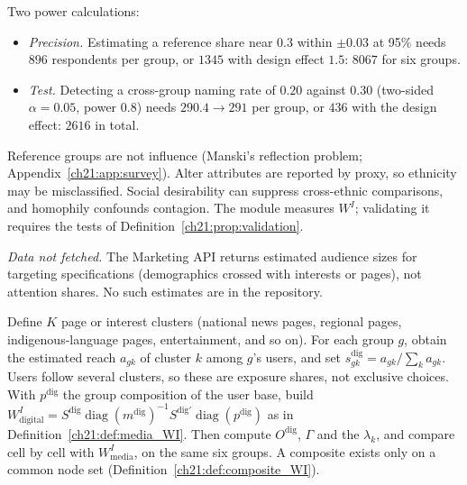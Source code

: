 \documentclass[../solutions_manual.tex]{subfiles}
\begin{document}
 Two power calculations:
\begin{itemize}
\item \emph{Precision.} Estimating a reference share near $0.3$ within $\pm0.03$ at 95\% needs $896$ respondents per group, or $1345$ with design effect $1.5$: $8067$ for six groups.
\item \emph{Test.} Detecting a cross-group naming rate of $0.20$ against $0.30$ (two-sided $\alpha = 0.05$, power $0.8$) needs $290.4 \to 291$ per group, or $436$ with the design effect: $2616$ in total.
\end{itemize}

 Reference groups are not influence (Manski's reflection problem; Appendix~\ref{ch21:app:survey}). Alter attributes are reported by proxy, so ethnicity may be misclassified. Social desirability can suppress cross-ethnic comparisons, and homophily confounds contagion. The module measures $W^I$; validating it requires the tests of Definition~\ref{ch21:prop:validation}.


\emph{Data not fetched.} The Marketing API returns estimated audience sizes for targeting specifications (demographics crossed with interests or pages), not attention shares. No such estimates are in the repository.

 Define $K$ page or interest clusters (national news pages, regional pages, indigenous-language pages, entertainment, and so on). For each group $g$, obtain the estimated reach $a_{gk}$ of cluster $k$ among $g$'s users, and set $s^{\text{dig}}_{gk} = a_{gk}/\sum_k a_{gk}$. Users follow several clusters, so these are exposure shares, not exclusive choices. With $p^{\text{dig}}$ the group composition of the user base, build $W^I_{\text{digital}} = S^{\text{dig}}\operatorname{diag}(m^{\text{dig}})^{-1}S^{\text{dig}\prime}\operatorname{diag}(p^{\text{dig}})$ as in Definition~\ref{ch21:def:media_WI}. Then compute $O^{\text{dig}}$, $\Gamma$ and the $\lambda_k$, and compare cell by cell with $W^I_{\text{media}}$, on the same six groups. A composite exists only on a common node set (Definition~\ref{ch21:def:composite_WI}).
\end{document}
